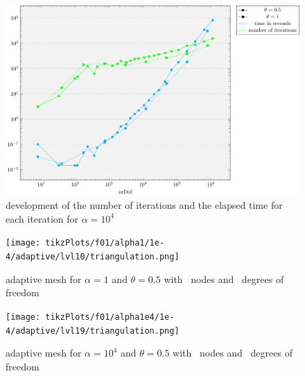 \documentclass[draft=false,twoside,12pt]{scrreprt}
\begin{document}
\vspace{-\parskip}
\begin{figure}[H]
	\centering
	\includegraphics[width=16cm]{tikzPlots/f01/alpha1e4/misc.pdf}
  \caption{development of the number of iterations and the elapsed time for 
  each iteration for $\alpha=10^4$}
\end{figure}



\vspace{-\parskip}
\begin{minipage}[t]{0.45\textwidth}
  \begin{figure}[H]
    \texttt{[image: tikzPlots/f01/alpha1/1e-4/adaptive/lvl10/triangulation.png]}
    \caption{adaptive mesh for $\alpha=1$ and $\theta = 0.5$ with \nrNodes\
    nodes and \nrDof\ degrees of freedom}
  \end{figure}
\end{minipage}
\hfill
\vline
\hfill
\begin{minipage}[t]{0.45\textwidth}
  \begin{figure}[H]
  	\centering
    \texttt{[image: tikzPlots/f01/alpha1e4/1e-4/adaptive/lvl19/triangulation.png]}
    \caption{adaptive mesh for $\alpha=10^4$ and $\theta = 0.5$ with
    \nrNodesAlt\ nodes and \nrDofAlt\ degrees of freedom}
  \end{figure}
\end{minipage}
\end{document}

